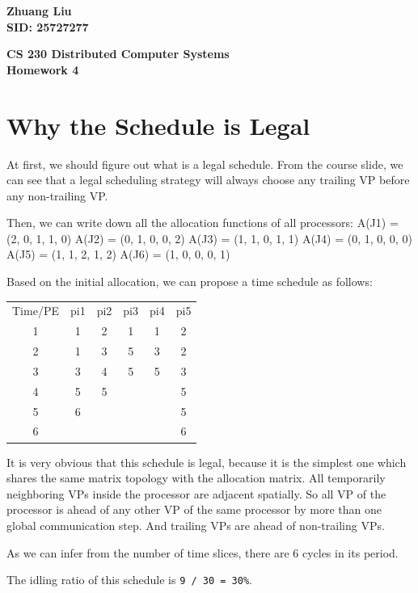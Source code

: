 \documentclass{article}%
\newenvironment{code}%
   {\snugshade\verbatim}%
   {\endverbatim\endsnugshade}
\begin{document}
\begin{flushright}
\begin{LARGE}

\textbf{Zhuang Liu \\
SID: 25727277}
\end{LARGE}
\end{flushright}

\begin{center}
\begin{huge}
\textbf{CS 230 Distributed Computer Systems \\
Homework 4} \\
\end{huge}
\end{center}

\section{Why the Schedule is Legal}
\begin{Large}
At first, we should figure out what is a legal schedule. From the course slide, we can see that a legal scheduling strategy will always choose any trailing VP before any non-trailing VP.

Then, we can write down all the allocation functions of all processors:
\begin{code}
    A(J1) = (2, 0, 1, 1, 0)
    A(J2) = (0, 1, 0, 0, 2)
    A(J3) = (1, 1, 0, 1, 1)
    A(J4) = (0, 1, 0, 0, 0)
    A(J5) = (1, 1, 2, 1, 2)
    A(J6) = (1, 0, 0, 0, 1)
\end{code}

Based on the initial allocation, we can propose a time schedule as follows:

\begin{center}
\begin{tabular}{ |c|c|c|c|c|c| } 
 \hline
 Time/PE & pi1 & pi2 & pi3 & pi4 & pi5 \\ 
 1 & 1 & 2 & 1 & 1 & 2 \\ 
 2 & 1 & 3 & 5 & 3 & 2 \\
 3 & 3 & 4 & 5 & 5 & 3 \\
 4 & 5 & 5 &   &   & 5 \\
 5 & 6 &   &   &   & 5 \\
 6 &   &   &   &   & 6 \\
 \hline
\end{tabular}
\end{center}
It is very obvious that this schedule is legal, because it is the simplest one which shares the same matrix topology with the allocation matrix. All temporarily neighboring VPs inside the processor are adjacent spatially. So all VP of the processor is ahead of any other VP of the same processor by more than one global communication step. And trailing VPs are ahead of non-trailing VPs.

As we can infer from the number of time slices, there are 6 cycles in its period.

The idling ratio of this schedule is \texttt{9 / 30 = 30\%}.

\end{Large}
\newpage
\end{document}
